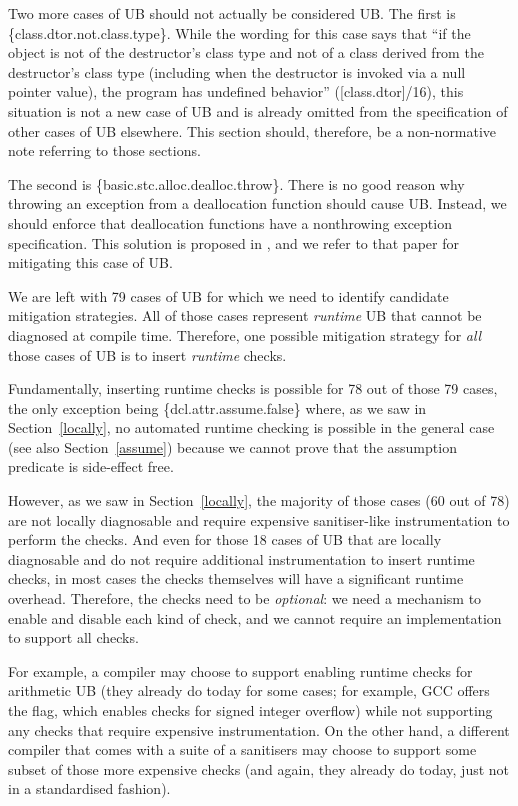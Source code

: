 Two more cases of UB should not actually be considered UB. The first is \{class.dtor.not.class.type\}. While the wording for this case says that ``if the object is not of the destructor's class type and not of a class derived from the destructor's class type (including when the destructor is invoked via a null pointer value), the program has undefined behavior'' ([class.dtor]/16),
this situation is not a new case of UB and is already omitted from the specification of other cases of UB elsewhere. This section should, therefore, be a non-normative note referring to those sections.

The second is \{basic.stc.alloc.dealloc.throw\}. There is no good reason why throwing an exception from a deallocation function should cause UB. Instead, we should enforce that deallocation functions have a nonthrowing exception specification. This solution is proposed in \cite{P3424R0}, and we refer to that paper for mitigating this case of UB.

We are left with 79 cases of UB for which we need to identify candidate mitigation strategies. All of those cases represent \emph{runtime} UB that cannot be diagnosed at compile time. Therefore, one possible mitigation strategy for \emph{all} those cases of UB is to insert \emph{runtime} checks.

Fundamentally, inserting runtime checks is possible for 78 out of those 79 cases, the only exception being \{dcl.attr.assume.false\} where, as we saw in Section~\ref{locally}, no automated runtime checking is possible in the general case (see also Section~\ref{assume}) because we cannot prove that the assumption predicate is side-effect free.

However, as we saw in Section~\ref{locally}, the majority of those cases (60 out of 78) are not locally diagnosable and require expensive sanitiser-like instrumentation to perform the checks. And even for those 18 cases of UB that are locally diagnosable and do not require additional instrumentation to insert runtime checks, in most cases the checks themselves will have a significant runtime overhead. Therefore, the checks need to be \emph{optional}: we need a mechanism to enable and disable each kind of check, and we cannot require an implementation to support all checks.

For example, a compiler may choose to support enabling runtime checks for arithmetic UB (they already do today for some cases; for example, GCC offers the  flag, which enables checks for signed integer overflow) while not supporting any checks that require expensive instrumentation. On the other hand, a different compiler that comes with a suite of a sanitisers may choose to support some subset of those more expensive checks (and again, they already do today, just not in a standardised fashion).

